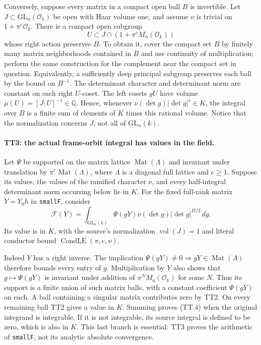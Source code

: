 Conversely, suppose every matrix in a compact open ball $B$ is
invertible. Let $J\subset\mathrm{GL}_n(\mathcal O_k)$ be open
with Haar volume one, and assume $\nu$ is trivial on
$1+\pi^e\mathcal O_k$. There is a compact open subgroup
\[
 U\subset J\cap(1+\pi^eM_n(\mathcal O_k))
\]
whose right action preserves $B$. To obtain it, cover the compact
set $B$ by finitely many matrix neighborhoods contained in $B$ and
use continuity of multiplication; perform the same construction
for the complement near the compact set in question. Equivalently,
a sufficiently deep principal subgroup preserves each ball by the
bound on $B^{-1}$. The determinant character and determinant norm
are constant on each right $U$-coset. The left cosets $gU$ have
volume $\mu(U)=[J:U]^{-1}\in\mathbb Q$. Hence, whenever
$\nu(\det g)|\det g|^s\in K$, the integral over $B$ is a finite
sum of elements of $K$ times this rational volume. Notice that the
normalization concerns $J$, not all of $\mathrm{GL}_n(k)$.

\paragraph{TT3: the actual frame-orbit integral has values in the field.}
Let $\Psi$ be supported on the matrix lattice $\operatorname{Mat}
(\Lambda)$ and invariant under translation by
$\pi^e\operatorname{Mat}(\Lambda)$, where $\Lambda$ is a diagonal
full lattice and $e\geq1$. Suppose its values, the values of the
ramified character $\nu$, and every half-integral determinant norm
occurring below lie in $K$. For the fixed full-rank matrix
$Y=Y_0h$ in \texttt{smallF}, consider
\[
 \mathcal F(Y)=\int_{\mathrm{GL}_a(k)}
       \Psi(gY)\nu(\det g)|\det g|^{D/2}\,dg.              \tag{TT.4}
\]
Its value is in $K$, with the source's normalization
$\operatorname{vol}(J)=1$ and literal conductor bound
$\operatorname{CondLE}(\pi,e,\nu)$.

Indeed $Y$ has a right inverse. The implication
$\Psi(gY)\ne0\Rightarrow gY\in\operatorname{Mat}(\Lambda)$
therefore bounds every entry of $g$. Multiplication by $Y$ also
shows that $g\mapsto\Psi(gY)$ is invariant under addition of
$\pi^NM_a(\mathcal O_k)$ for some $N$. Thus its support is a
finite union of such matrix balls, with a constant coefficient
$\Psi(gY)$ on each. A ball containing a singular matrix contributes
zero by TT2. On every remaining ball TT2 gives a value in $K$.
Summing proves (TT.4) when the original integrand is integrable.
If it is not integrable, its source integral is defined to be zero,
which is also in $K$. This last branch is essential: TT3 proves the
arithmetic of \texttt{smallF}, not its analytic absolute convergence.

